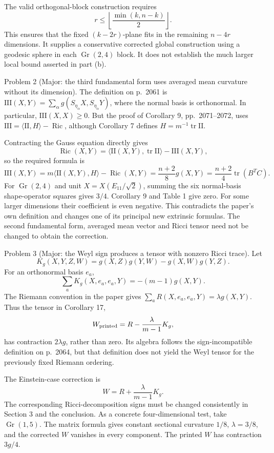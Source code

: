 \documentclass[10pt]{article}
\begin{document}
The valid orthogonal-block construction requires \[r\le \left\lfloor\frac{\min(k,n-k)}2\right\rfloor.\] This ensures that the fixed \((k-2r)\)-plane fits in the remaining \(n-4r\) dimensions. It supplies a conservative corrected global construction using a geodesic sphere in each \(\mathop{\mathrm{Gr}}(2,4)\) block. It does not establish the much larger local bound asserted in part (b).\par
Problem 2 (Major: the third fundamental form uses averaged mean curvature without its dimension).  The definition on p. 2061 is \(\mathrm{III}(X,Y)=\sum_\alpha g(S_{\eta_\alpha}X,S_{\eta_\alpha}Y)\), where the normal basis is orthonormal. In particular, \(\mathrm{III}(X,X)\ge0\). But the proof of Corollary 9, pp. 2071–2072, uses \(\mathrm{III}=\langle\mathrm{II},H\rangle-\mathop{\mathrm{Ric}}\), although Corollary 7 defines \(H=m^{-1}\mathop{\mathrm{tr}}\mathrm{II}\).\par
Contracting the Gauss equation directly gives \[\mathop{\mathrm{Ric}}(X,Y)=\langle\mathrm{II}(X,Y),\mathop{\mathrm{tr}}\mathrm{II}\rangle-\mathrm{III}(X,Y),\] so the required formula is \[\mathrm{III}(X,Y)=m\langle\mathrm{II}(X,Y),H\rangle-\mathop{\mathrm{Ric}}(X,Y)
          =\frac{n+2}{8}g(X,Y)
          =\frac{n+2}{4}\mathop{\mathrm{tr}}(B^TC).\] For \(\mathop{\mathrm{Gr}}(2,4)\) and unit \(X=X(E_{11}/\sqrt2)\), summing the six normal-basis shape-operator squares gives \(3/4\). Corollary 9 and Table 1 give zero. For some larger dimensions their coefficient is even negative. This contradicts the paper’s own definition and changes one of its principal new extrinsic formulas. The second fundamental form, averaged mean vector and Ricci tensor need not be changed to obtain the correction.\par
Problem 3 (Major: the Weyl sign produces a tensor with nonzero Ricci trace).  Let \[K_g(X,Y,Z,W)=g(X,Z)g(Y,W)-g(X,W)g(Y,Z).\] For an orthonormal basis \(e_a\), \[\sum_aK_g(X,e_a,e_a,Y)=-(m-1)g(X,Y).\] The Riemann convention in the paper gives \(\sum_aR(X,e_a,e_a,Y)=\lambda g(X,Y)\). Thus the tensor in Corollary 17, \[W_{\rm printed}=R-\frac{\lambda}{m-1}K_g,\] has contraction \(2\lambda g\), rather than zero. Its algebra follows the sign-incompatible definition on p. 2064, but that definition does not yield the Weyl tensor for the previously fixed Riemann ordering.\par
The Einstein-case correction is \[W=R+\frac{\lambda}{m-1}K_g.\] The corresponding Ricci-decomposition signs must be changed consistently in Section 3 and the conclusion. As a concrete four-dimensional test, take \(\mathop{\mathrm{Gr}}(1,5)\). The matrix formula gives constant sectional curvature \(1/8\), \(\lambda=3/8\), and the corrected \(W\) vanishes in every component. The printed \(W\) has contraction \(3g/4\).\par
\end{document}
